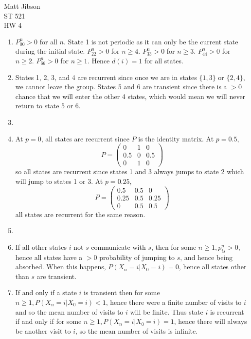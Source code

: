 \documentclass{article}
\begin{document}
\begin{flushright}
Matt Jibson \\
ST 521 \\
HW 4
\end{flushright}

\begin{enumerate}
	\item %
		$P_{00}^n > 0$ for all $n$. State 1 is not periodic as it can only be the current state during the initial state. $P_{22}^n > 0$ for $n \ge 4$. $P_{33}^n > 0$ for $n \ge 3$. $P_{44}^n > 0$ for $n \ge 2$. $P_{66}^n > 0$ for $n \ge 1$. Hence $d(i) = 1$ for all states.
	\item %
		States 1, 2, 3, and 4 are recurrent since once we are in states $\{1, 3\}$ or $\{2, 4\}$, we cannot leave the group. States 5 and 6 are transient since there is a $> 0$ chance that we will enter the other 4 states, which would mean we will never return to state 5 or 6.
	\item %
	\item %
		At $p = 0$, all states are recurrent since $P$ is the identity matrix. At $p = 0.5$,
		\begin{displaymath}
			P = \left( \begin{array}{ccc} 0 & 1 & 0 \\ 0.5 & 0 & 0.5 \\ 0 & 1 & 0 \end{array} \right)
		\end{displaymath}
		so all states are recurrent since states 1 and 3 always jumps to state 2 which will jump to states 1 or 3. At $p = 0.25$,
		\begin{displaymath}
			P = \left( \begin{array}{ccc} 0.5 & 0.5 & 0 \\ 0.25 & 0.5 & 0.25 \\ 0 & 0.5 & 0.5 \end{array} \right)
		\end{displaymath}
		all states are recurrent for the same reason.
	\item %
	\item %
		If all other states $i$ not $s$ communicate with $s$, then for some $n \ge 1, p_{is}^n > 0$, hence all states have a $> 0$ probability of jumping to $s$, and hence being absorbed. When this happens, $P(X_n = i | X_0 = i) = 0$, hence all states other than $s$ are transient.
	\item %
		If and only if a state $i$ is transient then for some $n \ge 1, P(X_n = i | X_0 = i) < 1$, hence there were a finite number of visits to $i$ and so the mean number of visits to $i$ will be finite. Thus state $i$ is recurrent if and only if for some $n \ge 1, P(X_n = i | X_0 = i) = 1$, hence there will always be another visit to $i$, so the mean number of visits is infinite.
\end{enumerate}
\end{document}
